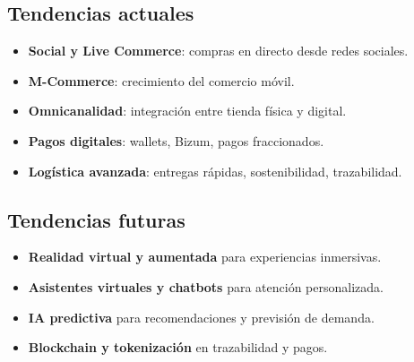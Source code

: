 \documentclass[11pt,a4paper]{article}
\begin{document}
\subsection{Tendencias actuales}
\begin{itemize}
	\item \textbf{Social y Live Commerce}: compras en directo desde redes sociales.
	\item \textbf{M-Commerce}: crecimiento del comercio móvil.
	\item \textbf{Omnicanalidad}: integración entre tienda física y digital.
	\item \textbf{Pagos digitales}: wallets, Bizum, pagos fraccionados.
	\item \textbf{Logística avanzada}: entregas rápidas, sostenibilidad, trazabilidad.
\end{itemize}

\subsection{Tendencias futuras}
\begin{itemize}
	\item \textbf{Realidad virtual y aumentada} para experiencias inmersivas.
	\item \textbf{Asistentes virtuales y chatbots} para atención personalizada.
	\item \textbf{IA predictiva} para recomendaciones y previsión de demanda.
	\item \textbf{Blockchain y tokenización} en trazabilidad y pagos.
\end{itemize}
\end{document}
